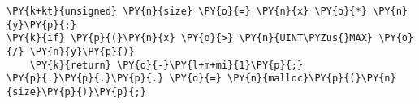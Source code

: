 \begin{Verbatim}[commandchars=\\\{\}]
\PY{k+kt}{unsigned} \PY{n}{size} \PY{o}{=} \PY{n}{x} \PY{o}{*} \PY{n}{y}\PY{p}{;}
\PY{k}{if} \PY{p}{(}\PY{n}{x} \PY{o}{>} \PY{n}{UINT\PYZus{}MAX} \PY{o}{/} \PY{n}{y}\PY{p}{)}
    \PY{k}{return} \PY{o}{-}\PY{l+m+mi}{1}\PY{p}{;}
\PY{p}{.}\PY{p}{.}\PY{p}{.} \PY{o}{=} \PY{n}{malloc}\PY{p}{(}\PY{n}{size}\PY{p}{)}\PY{p}{;}
\end{Verbatim}
